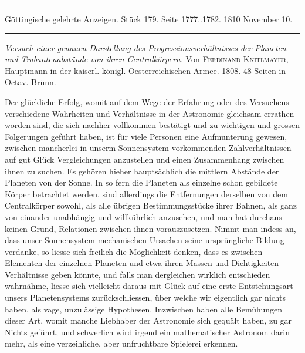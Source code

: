\par\bigskip
\hypertarget{native-533lower}{}\label{native-533lower}
\begin{center}
\parbox{.92\linewidth}{\centering\small
\rule{\linewidth}{.3pt}\par\smallskip
Göttingische gelehrte Anzeigen. Stück 179. Seite 1777..1782. 1810 November 10.\par\smallskip
\rule{\linewidth}{.3pt}}
\end{center}
\par\medskip

\emph{Versuch einer genauen Darstellung des Progressionsverhältnisses der Planeten- und Trabantenabstände von ihren Centralkörpern.} Von \textsc{Ferdinand Knitlmayer}, Hauptmann in der kaiserl. königl. Oesterreichischen Armee. 1808. 48 Seiten in Octav. Brünn.

Der glückliche Erfolg, womit auf dem Wege der Erfahrung oder des Versuchens verschiedene Wahrheiten und Verhältnisse in der Astronomie gleichsam errathen worden sind, die sich nachher vollkommen bestätigt und zu wichtigen und grossen Folgerungen geführt haben, ist für viele Personen eine Aufmunterung gewesen, zwischen mancherlei in unserm Sonnensystem vorkommenden Zahlverhältnissen auf gut Glück Vergleichungen anzustellen und einen Zusammenhang zwischen ihnen zu suchen. Es gehören hieher hauptsächlich die mittlern Abstände der Planeten von der Sonne. In so fern die Planeten als einzelne schon gebildete Körper betrachtet werden, sind allerdings die Entfernungen derselben von dem Centralkörper sowohl, als alle übrigen Bestimmungsstücke ihrer Bahnen, als ganz von einander unabhängig und willkührlich anzusehen, und man hat durchaus keinen Grund, Relationen zwischen ihnen vorauszusetzen. Nimmt man indess an, dass unser Sonnensystem mechanischen Ursachen seine ursprüngliche Bildung verdanke, so liesse sich freilich die Möglichkeit denken, dass es zwischen Elementen der einzelnen Planeten und etwa ihren Massen und Dichtigkeiten Verhältnisse geben könnte, und falls man dergleichen wirklich entschieden wahrnähme, liesse sich vielleicht daraus mit Glück auf eine erste Entstehungsart unsers Planetensystems zurückschliessen, über welche wir eigentlich gar nichts haben, als vage, unzulässige Hypothesen. Inzwischen haben alle Bemühungen dieser Art, womit manche Liebhaber der Astronomie sich gequält haben, zu gar Nichts geführt, und schwerlich wird irgend ein mathematischer Astronom darin mehr, als eine verzeihliche, aber unfruchtbare Spielerei erkennen.

